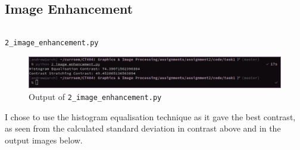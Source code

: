 \documentclass[a4paper]{article}
\newenvironment{code}{\captionsetup{type=listing}}{}
\begin{document}
\subsection{Image Enhancement}
\begin{code}
\inputminted[linenos, breaklines, frame=single]{python}{../code/task1/2_image_enhancement.py}
\caption{\texttt{2_image_enhancement.py}}
\end{code}

\begin{figure}[H]
    \centering
    \includegraphics[width=\textwidth]{./images/2_image_enhancement_output.png}
    \caption{Output of \texttt{2_image_enhancement.py}}
\end{figure}

I chose to use the histogram equalisation technique as it gave the best contrast, as seen from the calculated standard deviation in contrast above and in the output images below.
\end{document}
